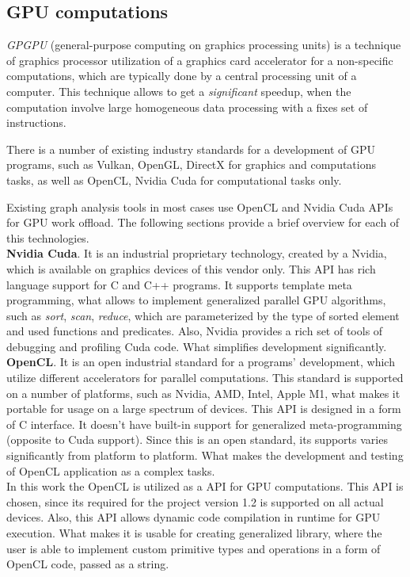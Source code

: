 \subsection{GPU computations}

\textit{GPGPU} (general-purpose computing on graphics processing units) is a technique of graphics processor utilization of a graphics card accelerator for a non-specific computations, which are typically done by a central processing unit of a computer. This technique allows to get a \textit{significant} speedup, when the computation involve large homogeneous data processing with a fixes set of instructions.

There is a number of existing industry standards for a development of GPU programs, such as Vulkan, OpenGL, DirectX for graphics and computations tasks, as well as OpenCL, Nvidia Cuda for computational tasks only.

Existing graph analysis tools in most cases use OpenCL and Nvidia Cuda APIs for GPU work offload. The following sections provide a brief overview for each of this technologies.\\

\textbf{Nvidia Cuda}. It is an industrial proprietary technology, created by a Nvidia, which is available on graphics devices of this vendor only. This API has rich language support for C and C++ programs. It supports template meta programming, what allows to implement generalized parallel GPU algorithms, such as \textit{sort}, \textit{scan}, \textit{reduce}, which are parameterized by the type of sorted element and used functions and predicates. Also, Nvidia provides a rich set of tools of debugging and profiling Cuda code. What simplifies development significantly.\\

\textbf{OpenCL}. It is an open industrial standard for a programs' development, which utilize different accelerators for parallel computations. This standard is supported on a number of platforms, such as Nvidia, AMD, Intel, Apple M1, what makes it portable for usage on a large spectrum of devices. This API is designed in a form of C interface. It doesn't have built-in support for generalized meta-programming (opposite to Cuda support). Since this is an open standard, its supports varies significantly from platform to platform. What makes the development and testing of OpenCL application as a complex tasks.\\

In this work the OpenCL is utilized as a API for GPU computations. This API is chosen, since its required for the project version 1.2 is supported on all actual devices. Also, this API allows dynamic code compilation in runtime for GPU execution. What makes it is usable for creating generalized library, where the user is able to implement custom primitive types and operations in a form of OpenCL code, passed as a string.

